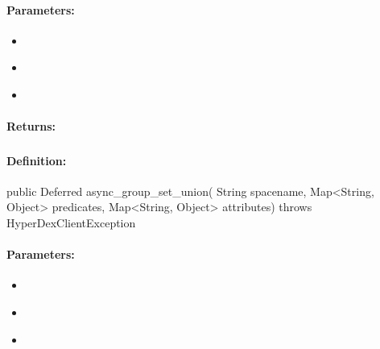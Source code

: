 \paragraph{Parameters:}
\begin{itemize}[noitemsep]
\item {}\\

\item {}\\

\item {}\\

\end{itemize}

\paragraph{Returns:}


\pagebreak
\subsubsection{}
\label{api:java:async_group_set_union}


\paragraph{Definition:}
\begin{javacode}
public Deferred async_group_set_union(
        String spacename,
        Map<String, Object> predicates,
        Map<String, Object> attributes) throws HyperDexClientException
\end{javacode}

\paragraph{Parameters:}
\begin{itemize}[noitemsep]
\item {}\\

\item {}\\

\item {}\\

\end{itemize}

